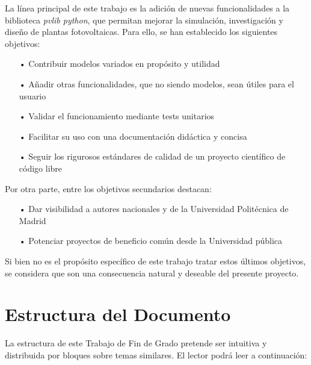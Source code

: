La línea principal de este trabajo es la adición de nuevas funcionalidades a la biblioteca \textit{pvlib python}, que permitan mejorar la simulación, investigación y diseño de plantas fotovoltaicas. Para ello, se han establecido los siguientes objetivos:

\begin{itemize}

    \item[•] Contribuir modelos variados en propósito y utilidad

    \item[•] Añadir otras funcionalidades, que no siendo modelos, sean útiles para el usuario

    \item[•] Validar el funcionamiento mediante tests unitarios

    \item[•] Facilitar su uso con una documentación didáctica y concisa

    \item[•] Seguir los rigurosos estándares de calidad de un proyecto científico de código libre

\end{itemize}

Por otra parte, entre los objetivos secundarios destacan:

\begin{itemize}

    \item [•] Dar visibilidad a autores nacionales y de la Universidad Politécnica de Madrid
    
    \item [•] Potenciar proyectos de beneficio común desde la Universidad pública

\end{itemize}

Si bien no es el propósito específico de este trabajo tratar estos últimos objetivos, se considera que son una consecuencia natural y deseable del presente proyecto.


\section{Estructura del Documento} \label{sct:intro_estructura}

La estructura de este Trabajo de Fin de Grado pretende ser intuitiva y distribuida por bloques sobre temas similares. El lector podrá leer a continuación:

